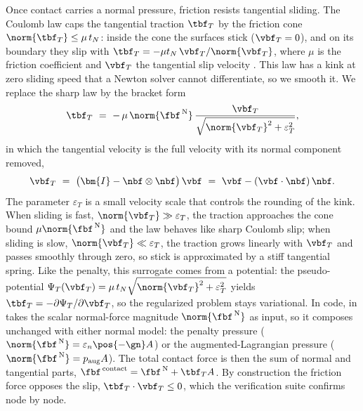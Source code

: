 Once contact carries a normal pressure, friction resists tangential sliding. The Coulomb law caps the
tangential traction $\tbf_T$ by the friction cone $\norm{\tbf_T}\le\mu\,t_N$: inside the cone the
surfaces stick ($\vbf_T=0$), and on its boundary they slip with
$\tbf_T=-\mu t_N\,\vbf_T/\norm{\vbf_T}$, where $\mu$ is the friction coefficient and $\vbf_T$ the
tangential slip velocity \citep{wriggers2006computational}. This law has a kink at zero sliding speed
that a Newton solver cannot differentiate, so we smooth it. We replace the sharp law by the
bracket form
\begin{equation}\label{eq:friction-reg}
\tbf_T\ =\ -\,\mu\,\norm{\fbf^{\,\mathrm{N}}}\,
\frac{\vbf_T}{\sqrt{\norm{\vbf_T}^2+\varepsilon_T^2}},
\end{equation}
in which the tangential velocity is the full velocity with its normal component removed,
\begin{equation}\label{eq:vt-projection}
\vbf_T\ =\ \big(\bm{I}-\nbf\otimes\nbf\big)\,\vbf\ =\ \vbf-(\vbf\cdot\nbf)\,\nbf .
\end{equation}
The parameter $\varepsilon_T$ is a small velocity scale that controls the rounding of the kink. When
sliding is fast, $\norm{\vbf_T}\gg\varepsilon_T$, the traction approaches the cone bound
$\mu\norm{\fbf^{\,\mathrm{N}}}$ and the law behaves like sharp Coulomb slip; when sliding is slow,
$\norm{\vbf_T}\ll\varepsilon_T$, the traction grows linearly with $\vbf_T$ and passes smoothly through
zero, so stick is approximated by a stiff tangential spring. Like the penalty, this surrogate comes
from a potential: the pseudo-potential
$\Psi_T(\vbf_T)=\mu\,t_N\sqrt{\norm{\vbf_T}^2+\varepsilon_T^2}$ yields
$\tbf_T=-\partial\Psi_T/\partial\vbf_T$, so the regularized problem stays variational. In code,
 in  takes the scalar normal-force
magnitude $\norm{\fbf^{\,\mathrm{N}}}$ as input, so it composes unchanged with either normal model: the
penalty pressure ($\norm{\fbf^{\,\mathrm{N}}}=\varepsilon_n\pos{-\gn}A$) or the augmented-Lagrangian
pressure ($\norm{\fbf^{\,\mathrm{N}}}=p_{\mathrm{aug}}A$). The total contact force is then the sum of
normal and tangential parts, $\fbf^{\,\mathrm{contact}}=\fbf^{\,\mathrm{N}}+\tbf_T A$. By construction
the friction force opposes the slip, $\tbf_T\cdot\vbf_T\le0$, which the verification suite confirms
node by node.

